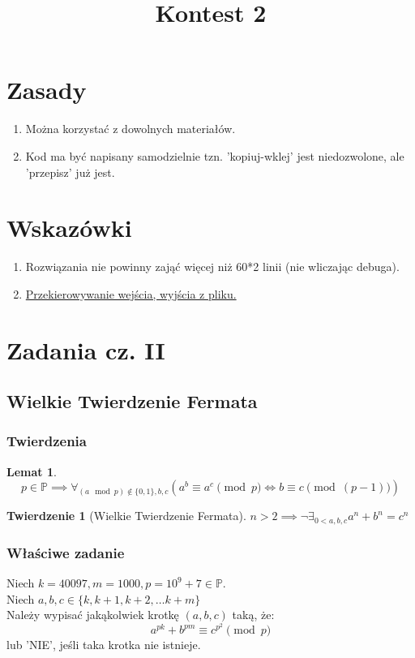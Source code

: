 \documentclass{article}
\theoremstyle{break}
\newtheorem{theorem}{Twierdzenie}
\newtheorem{lemma}{Lemat}
\begin{document}
\title{Kontest 2}

\maketitle

\section{Zasady}
\begin{enumerate}
\item Można korzystać z dowolnych materiałów.
\item Kod ma być napisany samodzielnie tzn. 'kopiuj-wklej' jest niedozwolone, ale 'przepisz' już jest.
\end{enumerate}
\section{Wskazówki}
\begin{enumerate}
\item Rozwiązania nie powinny zająć więcej niż 60*2 linii (nie wliczając debuga).
\item \href{https://www.oi.edu.pl/old/php/show.php?ac=p173000&module=show&file=oi18/przekierowanie}{Przekierowywanie wejścia, wyjścia z pliku.}
\end{enumerate}

\section{Zadania cz. II}
\subsection{Wielkie Twierdzenie Fermata}
\subsubsection{Twierdzenia}
\begin{lemma}
\begin{displaymath}
p \in \mathbb{P} \implies \forall_{(a \mod{p}) \not\in \{0, 1\}, b, c} (a^b \equiv a^c \pmod{p} \iff b \equiv c \pmod{(p-1)})
\end{displaymath}
\end{lemma}

\begin{theorem}[Wielkie Twierdzenie Fermata]
$n > 2 \implies \lnot \exists_{0 < a, b, c}a^n + b^n = c^n$
\end{theorem}
\subsubsection{Właściwe zadanie}
Niech $k = 40097, m = 1000, p = 10^{9} + 7 \in \mathbb{P}$. \\
Niech $a,b,c \in \{k, k+1, k+2, \dots k+m\}$ \\
Należy wypisać jakąkolwiek krotkę $(a,b,c)$  taką, że:
\begin{displaymath}
a^{pk} + b^{pm} \equiv c^{p^2} \pmod{p}
\end{displaymath}
lub 'NIE', jeśli taka krotka nie istnieje. \\
\end{document}
